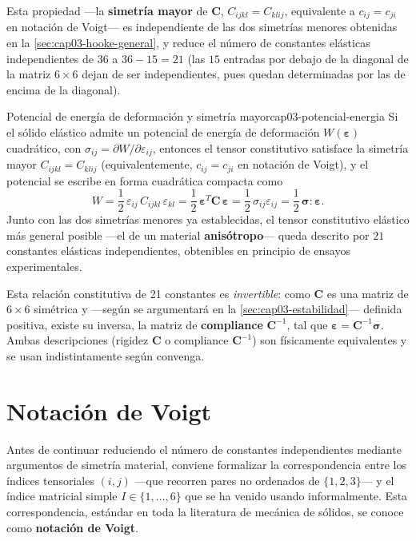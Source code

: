 Esta propiedad —la \textbf{simetría mayor} de $\bm C$, $C_{ijkl}=C_{klij}$, equivalente a $c_{ij}=c_{ji}$ en notación de Voigt— es independiente de las dos simetrías menores obtenidas en la \cref{sec:cap03-hooke-general}, y reduce el número de constantes elásticas independientes de $36$ a $36-15=21$ (las $15$ entradas por debajo de la diagonal de la matriz $6\times 6$ dejan de ser independientes, pues quedan determinadas por las de encima de la diagonal).

\begin{ecnimportante}{Potencial de energía de deformación y simetría mayor}{cap03-potencial-energia}
Si el sólido elástico admite un potencial de energía de deformación $W(\bm\varepsilon)$ cuadrático, con $\sigma_{ij}=\partial W/\partial\varepsilon_{ij}$, entonces el tensor constitutivo satisface la simetría mayor $C_{ijkl}=C_{klij}$ (equivalentemente, $c_{ij}=c_{ji}$ en notación de Voigt), y el potencial se escribe en forma cuadrática compacta como
\[
W = \frac{1}{2}\,\varepsilon_{ij}\,C_{ijkl}\,\varepsilon_{kl} = \frac{1}{2}\,\bm\varepsilon^{T}\bm C\,\bm\varepsilon = \frac{1}{2}\,\sigma_{ij}\varepsilon_{ij} = \frac{1}{2}\,\bm\sigma:\bm\varepsilon.
\]
Junto con las dos simetrías menores ya establecidas, el tensor constitutivo elástico más general posible —el de un material \textbf{anisótropo}— queda descrito por $\boxed{21}$ constantes elásticas independientes, obtenibles en principio de ensayos experimentales.
\end{ecnimportante}

Esta relación constitutiva de 21 constantes es \emph{invertible}: como $\bm C$ es una matriz de $6\times 6$ simétrica y —según se argumentará en la \cref{sec:cap03-estabilidad}— definida positiva, existe su inversa, la matriz de \textbf{compliance} $\bm C^{-1}$, tal que $\bm\varepsilon=\bm C^{-1}\bm\sigma$. Ambas descripciones (rigidez $\bm C$ o compliance $\bm C^{-1}$) son físicamente equivalentes y se usan indistintamente según convenga.

\section{Notación de Voigt}
\label{sec:cap03-voigt}

Antes de continuar reduciendo el número de constantes independientes mediante argumentos de simetría material, conviene formalizar la correspondencia entre los índices tensoriales $(i,j)$ —que recorren pares no ordenados de $\{1,2,3\}$— y el índice matricial simple $I\in\{1,\dots,6\}$ que se ha venido usando informalmente. Esta correspondencia, estándar en toda la literatura de mecánica de sólidos, se conoce como \textbf{notación de Voigt}.

